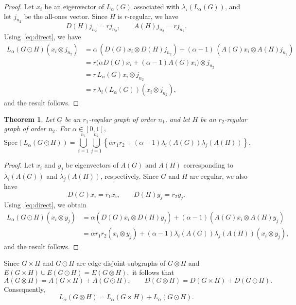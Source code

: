 \documentclass{article}
\newtheorem{theorem}{Theorem}[section]
\begin{document}
\begin{proof}
Let $x_i$ be an eigenvector of $L_\alpha(G)$ associated with $\lambda_i(L_\alpha(G))$, and let $j_{n_2}$ be the all-ones vector. Since $H$ is $r$-regular, we have
\[
D(H)j_{n_2} = r j_{n_2}, \qquad A(H)j_{n_2} = r j_{n_2}.
\]
Using~\eqref{eq:direct}, we have
\begin{align*}
L_\alpha(G \odot H)(x_i \otimes j_{n_2})
&=
\alpha\,(D(G)x_i \otimes D(H)j_{n_2})
+
(\alpha-1)\,(A(G)x_i \otimes A(H)j_{n_2}) \\
&=
r\Big(\alpha D(G)x_i + (\alpha-1)A(G)x_i\Big)\otimes j_{n_2} \\
&=
r\,L_\alpha(G)x_i \otimes j_{n_2} \\
&=
r\,\lambda_i(L_\alpha(G)) (x_i \otimes j_{n_2}),
\end{align*}
and the result follows.
\end{proof}

\begin{theorem}\label{teorema36}
Let $G$ be an $r_1$-regular graph of order $n_1$, and let $H$ be an $r_2$-regular graph of order $n_2$. For $\alpha \in [0,1],$
\[
\mathrm{Spec}(L_{\alpha}(G \odot H)) =
\bigcup_{i=1}^{n_{1}} \bigcup_{j=1}^{n_{2}}
\left\{
\alpha r_1 r_2 + (\alpha-1)\lambda_i(A(G))\lambda_j(A(H))
\right\}.
\]
\end{theorem}

\begin{proof}
Let $x_i$ and $y_j$ be eigenvectors of $A(G)$ and $A(H)$ corresponding to $\lambda_i(A(G))$ and $\lambda_j(A(H))$, respectively. Since $G$ and $H$ are regular, we also have
\[
D(G)x_i = r_1 x_i, \qquad D(H)y_j = r_2 y_j.
\]
Using~\eqref{eq:direct}, we obtain
\begin{align*}
L_\alpha(G \odot H)(x_i \otimes y_j)
&=
\alpha (D(G)x_i \otimes D(H)y_j)
+
(\alpha-1)(A(G)x_i \otimes A(H)y_j) \\
&=
\alpha r_1 r_2 (x_i \otimes y_j)
+
(\alpha-1)\lambda_i(A(G))\lambda_j(A(H))(x_i \otimes y_j),
\end{align*}
and the result follows.
\end{proof}

Since $G \times H$ and $G \odot H$ are edge-disjoint subgraphs of $G \otimes H$ and $E(G \times H)\cup E(G \odot H)=E(G\otimes H),$
it follows that
\[
A(G \otimes H) = A(G \times H) + A(G\odot H), \qquad 
D(G \otimes H) = D(G\times H) + D(G\odot H).
\]
Consequently,
\begin{equation}\label{eq:otimes}
L_\alpha(G \otimes H)
=
L_\alpha(G \times H) + L_\alpha(G\odot H).
\end{equation}
\end{document}
